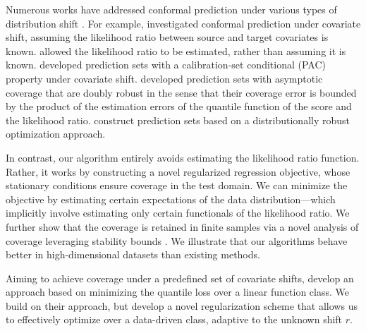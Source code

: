 Numerous works have addressed conformal prediction under various types of distribution shift 
\citep{tibshirani2019conformal,park2021pac,park2022pac,qiu2023prediction,si2023pac}. For example, \citet{tibshirani2019conformal} investigated conformal prediction under covariate shift, assuming the likelihood ratio between source and target covariates is known. 
\citet{Lei2021} allowed the likelihood ratio to be estimated, rather than assuming it is known.
\citet{park2021pac} developed prediction sets with a calibration-set conditional (PAC) property under covariate shift. 
\citet{qiu2023prediction,yang2024doubly} developed prediction sets with asymptotic coverage that are doubly robust in the sense that their coverage error is bounded by the product of the estimation errors of the quantile function of the score and the likelihood ratio.
\citet{cauchois2024robust} construct prediction sets based on a distributionally robust optimization approach.

In contrast, our algorithm entirely avoids estimating the likelihood ratio function. Rather, it works by constructing a novel regularized regression objective, whose stationary conditions ensure coverage in the test domain.
We can minimize the objective by estimating certain expectations of the data distribution---which implicitly involve estimating only certain functionals of the likelihood ratio.
We further show that the coverage is retained in finite samples via a novel analysis of coverage leveraging stability bounds 
\cite{shalev2010learnability, shalev2014understanding}. We illustrate that our algorithms behave better in high-dimensional datasets than existing methods.

Aiming to achieve coverage under a predefined set of covariate shifts,
\citet{gibbs2023conformal} develop an approach based on minimizing the quantile loss over a linear function class.
We build on their approach, but develop a novel regularization scheme that 
allows us to 
effectively optimize over a data-driven class,
adaptive to the unknown shift $r$.
